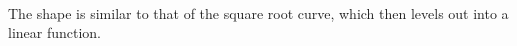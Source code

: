 \documentclass[11pt]{article}
\begin{document}
    \begin{center}
    \end{center}
    { \hspace*{\fill} \\}
    
    The shape is similar to that of the square root curve, which then levels
out into a linear function.


    
    
    
\end{document}
